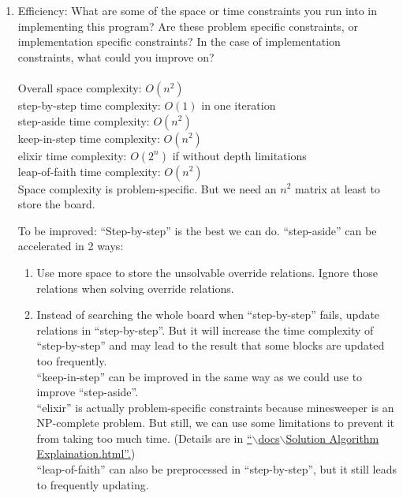 \documentclass[letter]{article}
\begin{document}
\begin{enumerate}
	\item {Efficiency: What are some of the space or time constraints you run into in implementing this program? Are these problem specific constraints, or implementation specific constraints? In the case of implementation constraints, what could you improve on?} \\
	\\
	Overall space complexity: $ O(n^2) $ \\
	step-by-step time complexity: $ O(1) $ in one iteration \\
	step-aside time complexity: $ O(n^2) $ \\
	keep-in-step time complexity: $ O(n^2) $ \\
	elixir time complexity: $ O(2^n) $ if without depth limitations \\
	leap-of-faith time complexity: $ O(n^2) $ \\
	
	Space complexity is problem-specific. But we need an $ n^2 $ matrix at least to store the board.
	
	To be improved: 
	``Step-by-step'' is the best we can do.
	``step-aside'' can be accelerated in 2 ways:
	\begin{enumerate}
		\item {Use more space to store the unsolvable override relations. Ignore those relations when solving override relations.}
		\item {Instead of searching the whole board when ``step-by-step'' fails, update relations in ``step-by-step''. But it will increase the time complexity of ``step-by-step'' and may lead to the result that some blocks are updated too frequently. \\ 
		``keep-in-step'' can be improved in the same way as we could use to improve ``step-aside''. \\
		``elixir'' is actually problem-specific constraints because minesweeper is an NP-complete problem. But still, we can use some limitations to prevent it from taking too much time. (Details are in \href{run:Solution Algorithm Explaination.html}{``$ \backslash $docs$ \backslash $Solution Algorithm Explaination.html''.}) \\
		``leap-of-faith'' can also be preprocessed in ``step-by-step'', but it still leads to frequently updating.}
	\end{enumerate}
	

\end{enumerate}
\end{document}

